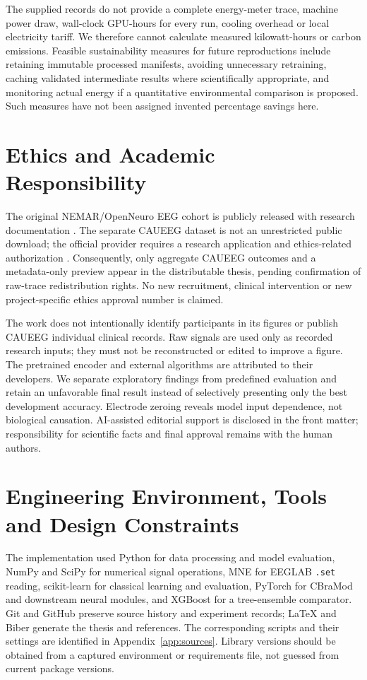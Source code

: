 The supplied records do not provide a complete energy-meter trace, machine power draw, wall-clock GPU-hours for every run, cooling overhead or local electricity tariff. We therefore cannot calculate measured kilowatt-hours or carbon emissions. Feasible sustainability measures for future reproductions include retaining immutable processed manifests, avoiding unnecessary retraining, caching validated intermediate results where scientifically appropriate, and monitoring actual energy if a quantitative environmental comparison is proposed. Such measures have not been assigned invented percentage savings here.

\section{Ethics and Academic Responsibility}
The original NEMAR/OpenNeuro EEG cohort is publicly released with research documentation \cite{miltiadous2023dataset,miltiadous2026dataset}. The separate CAUEEG dataset is not an unrestricted public download; the official provider requires a research application and ethics-related authorization \cite{caueegofficial}. Consequently, only aggregate CAUEEG outcomes and a metadata-only preview appear in the distributable thesis, pending confirmation of raw-trace redistribution rights. No new recruitment, clinical intervention or new project-specific ethics approval number is claimed.

The work does not intentionally identify participants in its figures or publish CAUEEG individual clinical records. Raw signals are used only as recorded research inputs; they must not be reconstructed or edited to improve a figure. The pretrained encoder and external algorithms are attributed to their developers. We separate exploratory findings from predefined evaluation and retain an unfavorable final result instead of selectively presenting only the best development accuracy. Electrode zeroing reveals model input dependence, not biological causation. AI-assisted editorial support is disclosed in the front matter; responsibility for scientific facts and final approval remains with the human authors.

\section{Engineering Environment, Tools and Design Constraints}
The implementation used Python for data processing and model evaluation, NumPy and SciPy for numerical signal operations, MNE for EEGLAB \texttt{.set} reading, scikit-learn for classical learning and evaluation, PyTorch for CBraMod and downstream neural modules, and XGBoost for a tree-ensemble comparator. Git and GitHub preserve source history and experiment records; \LaTeX{} and Biber generate the thesis and references. The corresponding scripts and their settings are identified in Appendix~\ref{app:sources}. Library versions should be obtained from a captured environment or requirements file, not guessed from current package versions.

